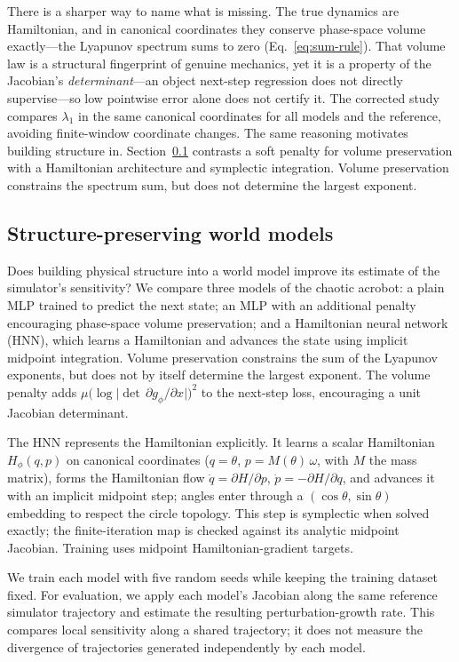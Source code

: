 \documentclass[11pt]{article}
\begin{document}
There is a sharper way to name what is missing. The true dynamics are Hamiltonian, and in canonical
coordinates they conserve phase-space volume exactly---the Lyapunov spectrum sums to zero
(Eq.~\eqref{eq:sum-rule}). That volume law is a structural fingerprint of genuine mechanics, yet it is a
property of the Jacobian's \emph{determinant}---an object next-step regression does not
directly supervise---so low pointwise error alone does not certify it. The corrected study compares $\lambda_1$ in the same canonical coordinates for all models
and the reference, avoiding finite-window coordinate changes. The same reasoning motivates
building structure in. Section~\ref{sec:B-structure} contrasts a soft penalty for volume
preservation with a Hamiltonian architecture and symplectic integration. Volume preservation
constrains the spectrum sum, but does not determine the largest exponent.

\subsection{Structure-preserving world models}\label{sec:B-structure}

Does building physical structure into a world model improve its estimate of the
simulator's sensitivity? We compare three models of the chaotic acrobot: a plain MLP
trained to predict the next state; an MLP with an additional penalty encouraging
phase-space volume preservation; and a Hamiltonian neural network (HNN), which learns
a Hamiltonian and advances the state using implicit midpoint integration. Volume
preservation constrains the sum of the Lyapunov exponents, but does not by itself
determine the largest exponent. The volume penalty adds
$\mu\bigl(\log\lvert\det\,\partial g_\phi/\partial x\rvert\bigr)^2$
to the next-step loss, encouraging a unit Jacobian determinant.

The HNN represents the Hamiltonian explicitly. It learns a scalar Hamiltonian $H_\phi(q,p)$ on canonical
coordinates ($q=\theta$, $p=M(\theta)\,\omega$, with $M$ the mass matrix), forms the Hamiltonian flow
$\dot q=\partial H/\partial p$, $\dot p=-\partial H/\partial q$, and advances it with an implicit midpoint
step; angles enter through a $(\cos\theta,\sin\theta)$ embedding to respect the circle topology. This step is symplectic when solved exactly; the finite-iteration map is checked against
its analytic midpoint Jacobian. Training uses midpoint Hamiltonian-gradient targets.

We train each model with five random seeds while keeping the training dataset fixed.
For evaluation, we apply each model's Jacobian along the same reference simulator
trajectory and estimate the resulting perturbation-growth rate. This compares local
sensitivity along a shared trajectory; it does not measure the divergence of trajectories
generated independently by each model.
\end{document}
